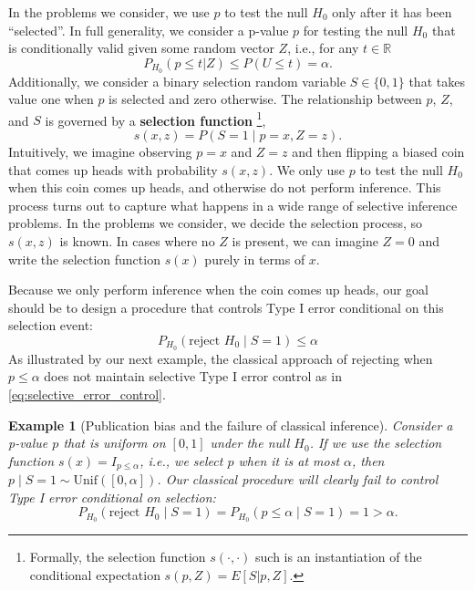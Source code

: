 \documentclass{article}
\newtheorem{example}{Example}
\newcommand{\R}{\mathbb{R}}
\begin{document}
In the problems we consider, we use $p$ to test the null $H_0$ only after it has been ``selected''. In full generality, we consider a p-value $p$ for testing the null $H_0$ that is conditionally valid given some random vector $Z$, i.e., for any $t \in \R$ 
\begin{equation}
    \label{eq:valid_given_z}
    P_{H_0}(p \leq t | Z) \leq P(U \leq t)  = \alpha.
\end{equation}
Additionally, we consider a binary selection random variable $S \in \{0, 1\}$ that takes value one when $p$ is selected and zero otherwise. The relationship between $p$, $Z$, and $S$ is governed by a \textbf{selection function} \footnote{Formally, the selection function $s(\cdot, \cdot)$ such is an instantiation of the conditional expectation $s(p, Z) = E[S|p , Z ]$. },
\begin{equation*}
    s(x, z) = P(S = 1 \mid p = x, Z = z).
\end{equation*}
Intuitively, we imagine observing $p=x$ and $Z=z$ and then flipping a biased coin that comes up heads with probability $s(x, z)$. We only use $p$ to test the null $H_0$ when this coin comes up heads, and otherwise do not perform inference. This process turns out to capture what happens in a wide range of selective inference problems. In the problems we consider, we decide the selection process, so $s(x, z)$ is known. In cases where no $Z$ is present, we can imagine $Z=0$ and write the selection function $s(x)$ purely in terms of $x$. 

Because we only perform inference when the coin comes up heads, our goal should be to design a procedure that controls Type I error conditional on this selection event:
\begin{equation}
    \label{eq:selective_error_control}
    P_{H_0}(\text{reject } H_0 \mid S = 1) \leq \alpha 
\end{equation}
As illustrated by our next example, the classical approach of rejecting when $p \leq \alpha$ does not maintain selective Type I error control as in \eqref{eq:selective_error_control}. 

\begin{example}[Publication bias and the failure of classical inference]
\label{exm:publication_bias}
Consider a p-value $p$ that is uniform on $[0, 1]$ under the null $H_0$. If we use the selection function $s(x) = I_{p \leq \alpha}$, i.e., we select $p$ when it is at most $\alpha$, then $p \mid S=1 \sim \text{Unif}([0, \alpha])$. Our classical procedure will clearly fail to control Type I error conditional on selection:
\begin{equation*}
    P_{H_0}(\text{reject } H_0 \mid S=1) = P_{H_0}(p \leq \alpha \mid S=1) = 1 > \alpha. 
\end{equation*}
\end{example}
\end{document}

